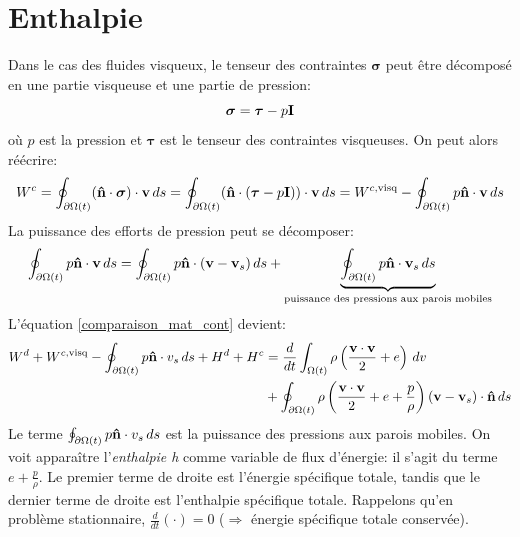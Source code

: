 \section{Enthalpie}
Dans le cas des fluides visqueux, le tenseur des contraintes $\boldsymbol{\sigma}$ peut être décomposé en une partie visqueuse et une partie de pression:
$$\boldsymbol{\sigma}=\boldsymbol{\tau}-p\textbf{I}$$ où $p$ est la pression et $\boldsymbol{\tau}$ est le tenseur des contraintes visqueuses. On peut alors réécrire:
$$W^c=\oint_{\partial\Omega (t)}(\textbf{\^n}\cdot\boldsymbol{\sigma})\cdot\textbf{v}\,ds=\oint_{\partial\Omega (t)}(\textbf{\^n}\cdot(\boldsymbol{\tau}-p\textbf{I}))\cdot\textbf{v}\,ds=W^{c,\text{visq}}-\oint_{\partial\Omega (t)}p\textbf{\^n}\cdot\textbf{v}\,ds$$
La puissance des efforts de pression peut se décomposer:
$$\oint_{\partial\Omega (t)}p\textbf{\^n}\cdot\textbf{v}\,ds=\oint_{\partial\Omega (t)}p\textbf{\^n}\cdot(\textbf{v}-\textbf{v}_s)\,ds+\underbrace{\oint_{\partial\Omega (t)}p\textbf{\^n}\cdot\textbf{v}_s\,ds}_{\text{puissance des pressions aux parois mobiles}}$$
L'équation \ref{comparaison_mat_cont} devient:
\begin{align*}
W^d+W^{c,\text{visq}}-\oint_{\partial\Omega (t)}p\textbf{\^n}\cdot{v}_s\,ds+H^d+H^c&=\frac{d}{dt}\int_{\Omega (t)}\rho\left(\frac{\textbf{v}\cdot\textbf{v}}{2}+e\right)\,dv\\
 &+\oint_{\partial\Omega (t)}\rho\left(\frac{\textbf{v}\cdot\textbf{v}}{2}+e+\frac{p}{\rho}\right)(\textbf{v}-\textbf{v}_s)\cdot\textbf{\^n}\,ds\\
\end{align*}
Le terme $\oint_{\partial\Omega (t)}p\textbf{\^n}\cdot{v}_s\,ds$ est la puissance des pressions aux parois mobiles. On voit apparaître l'\emph{enthalpie h} comme variable de flux d'énergie: il s'agit du terme $e+\frac{p}{\rho}$. Le premier terme de droite est l'énergie spécifique totale, tandis que le dernier terme de droite est l'enthalpie spécifique totale. Rappelons qu'en problème stationnaire, $\frac{d}{dt}(\cdot)=0$ ($\Rightarrow$ énergie spécifique totale conservée).

